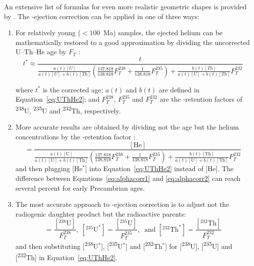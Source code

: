 \begin{refsection}
An extensive list of formulas for even more realistic geometric shapes
is provided by \citet{ketcham2011}. The \textalpha-ejection correction
can be applied in one of three ways:

\begin{enumerate}
\item For relatively young ($<100$~Ma) samples, the ejected helium can
  be mathematically restored to a good approximation by dividing the
  uncorrected U--Th--He age by $F_T$ \citet{farley2002}:
  \begin{equation}
    t^* \approx \frac{t}{
      \frac{a(t)[U]}{a(t)[U]+b(t)[Th]}
      \left(
      \frac{137.818}{138.818} F_T^{238} +
      \frac{1}{138.818} F_T^{235}
      \right) + 
      \frac{b(t)[Th]}{a(t)[U]+b(t)[Th]} F_T^{232}
    }
    \label{eq:alphacorr1}
  \end{equation}

  \noindent where $t^*$ is the corrected age; $a(t)$ and $b(t)$ are
  defined in Equation~\ref{eq:UThHe2}; and $F_T^{238}$, $F_T^{235}$
  and $F_T^{232}$ are the \textalpha-retention factors of
  \textsuperscript{238}U, \textsuperscript{235}U and
  \textsuperscript{232}Th, respectively.
\item More accurate results are obtained by dividing not the age but
  the helium concentrations by the \textalpha-retention factor
  \citep{min2003, vermeesch2008a}:
  \begin{equation}
    [\mbox{He}^*] = \frac{[\mbox{He}]}{
      \frac{a(t)[\mbox{U}]}{a(t)[\mbox{U}]+b(t)[\mbox{Th}]}
      \left(
      \frac{137.818}{138.818} F_T^{238} +
      \frac{1}{138.818} F_T^{235}
      \right) + 
      \frac{b(t)[\mbox{Th}]}{a(t)[\mbox{U}]+b(t)[\mbox{Th}]} F_T^{232}
    }
    \label{eq:alphacorr2}
  \end{equation}
  \noindent and then plugging [He$^*$] into Equation~\ref{eq:UThHe2}
  instead of [He]. The difference between
  Equations~\ref{eq:alphacorr1} and \ref{eq:alphacorr2} can reach
  several percent for early Precambrian ages.
\item The most accurate approach to \textalpha-ejection correction is to
  adjust not the radiogenic daughter product but the radioactive
  parents:
  \begin{equation}
      [{}^{238}\mbox{U}^*] = \frac{[{}^{238}\mbox{U}]}{F_T^{238}},~
      [{}^{235}\mbox{U}^*] = \frac{[{}^{235}\mbox{U}]}{F_T^{235}},~
      \mbox{~and~} [{}^{232}\mbox{Th}^*] =
      \frac{[{}^{232}\mbox{Th}]}{F_T^{232}}
    \label{eq:alphacorr3}
  \end{equation}
  \noindent and then substituting [\textsuperscript{238}U$^*$],
            [\textsuperscript{235}U$^*$] and [\textsuperscript{232}Th$^*$]
            for [\textsuperscript{238}U], [\textsuperscript{235}U] and
            [\textsuperscript{232}Th] in Equation~\ref{eq:UThHe2}.
\end{enumerate}


\end{refsection}
